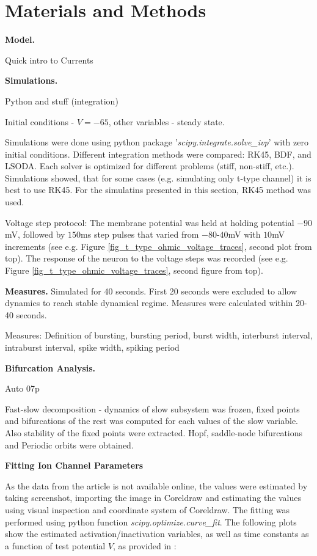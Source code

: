 \documentclass[../main.tex]{subfiles}
\begin{document}
\section{Materials and Methods} \label{sec:materials_and_methods}

\noindent\textbf{Model.}

Quick intro to Currents

\noindent\textbf{Simulations.}

Python and stuff (integration)

Initial conditions - $V=-65$, other variables - steady state.

Simulations were done using python package '\textit{scipy.integrate.solve\_ivp}' with
zero initial conditions. Different integration methods were compared: RK45, BDF, and LSODA.
Each solver is optimized for different problems (stiff, non-stiff, etc.). Simulations
showed, that for some cases (e.g. simulating only t-type channel) it is best to use
RK45. For the simulatins presented in this section, RK45 method was used.

Voltage step protocol: The membrane potential was held at holding potential $-90$ mV,
followed by $150$ms step pulses that varied from $-80$-$40$mV with $10$mV increments
(see e.g. Figure \ref{fig_t_type_ohmic_voltage_traces}, second plot from top). The response
of the neuron to the voltage steps was recorded (see e.g. Figure \ref{fig_t_type_ohmic_voltage_traces}, second figure from top).

\noindent\textbf{Measures.}
Simulated for 40 seconds. First 20 seconds were excluded to allow dynamics to reach stable dynamical regime. Measures were calculated within 20-40 seconds.

Measures: Definition of bursting, bursting period, burst width, interburst interval, intraburst interval, spike width, spiking period

\noindent\textbf{Bifurcation Analysis.}

Auto 07p

Fast-slow decomposition - dynamics of slow subsystem was frozen, fixed points and bifurcations of the rest was computed for each values of the slow variable. Also stability of the fixed points were extracted. Hopf, saddle-node bifurcations and Periodic orbits were obtained.

\noindent\textbf{Fitting Ion Channel Parameters}

As the data from the article is not available online, the values were estimated by taking screenshot, importing the image in Coreldraw and estimating the values using visual inspection and coordinate system of Coreldraw. The fitting was performed using python function \textit{scipy.optimize.curve\_fit}.
The following plots show the estimated activation/inactivation variables, as well as time constants
as a function of test potential $V$, as provided in \parencite{jeongCaa1TFlyTtype2015}:
\end{document}
